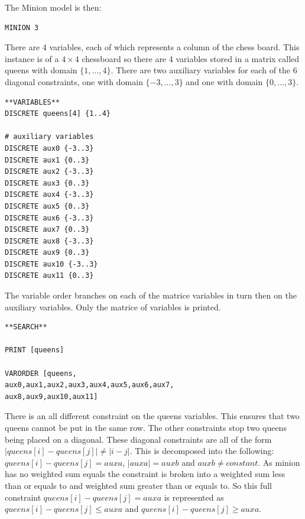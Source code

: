 \documentclass[oneside]{book}
\begin{document}
The Minion model is then: 
\begin{verbatim}
MINION 3
\end{verbatim}

There are 4 variables, each of which represents a column of the chess board. This instance is of a $4 \times 4$ chessboard so there are 4 variables stored in a matrix called queens with domain $\{1,\ldots ,4\}$.  There are two auxiliary variables for each of the 6 diagonal constraints, one with domain $\{-3, \ldots ,3\}$ and one with domain $\{0, \ldots ,3\}$.

\begin{verbatim}
**VARIABLES**
DISCRETE queens[4] {1..4}

# auxiliary variables
DISCRETE aux0 {-3..3}
DISCRETE aux1 {0..3}
DISCRETE aux2 {-3..3}
DISCRETE aux3 {0..3}
DISCRETE aux4 {-3..3}
DISCRETE aux5 {0..3}
DISCRETE aux6 {-3..3}
DISCRETE aux7 {0..3}
DISCRETE aux8 {-3..3}
DISCRETE aux9 {0..3}
DISCRETE aux10 {-3..3}
DISCRETE aux11 {0..3}
\end{verbatim}

The variable order branches on each of the matrice variables in turn then on the auxiliary variables. Only the matrice of variables is printed.
\begin{verbatim}
**SEARCH**

PRINT [queens]

VARORDER [queens,
aux0,aux1,aux2,aux3,aux4,aux5,aux6,aux7,
aux8,aux9,aux10,aux11]
\end{verbatim}

There is an all different constraint on the queens variables. This ensures that two queens cannot be put in the same row. The other constraints stop two queens being placed on a diagonal. These diagonal constraints are all of the form $|queens[i] - queens[j]| \ne |i - j|$.  This is decomposed into the following: $queens[i] - queens[j] = auxa$, $|auxa| = auxb$ and $auxb \ne constant$.  As minion has no weighted sum equals the constraint is broken into a weighted sum less than or equals to and weighted sum greater than or equals to. So this full constraint $queens[i] - queens[j] = auxa$  is represented as $queens[i] - queens[j] \leq auxa$ and $queens[i] - queens[j] \geq auxa$.
\end{document}
